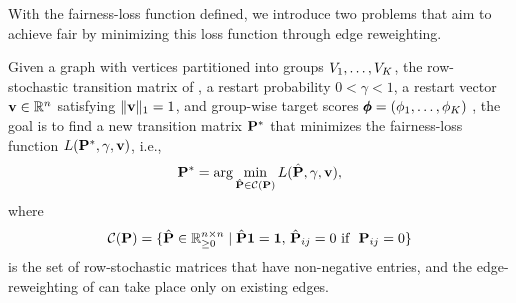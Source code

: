 \documentclass[sigconf, anonymous, review]{acmart}
\begin{document}


With the fairness-loss function defined, we introduce two problems that aim to achieve fair \pagerank by minimizing this loss function through edge re\-weighting.

\begin{problem}[$\groupDist$-\pagerank]
\label{problem:fair_problem}
Given a graph \graph with vertices partitioned into groups $V_1, \ldots, V_K$, the row-stochastic transition matrix \transmatrix of \graph, a restart probability $0 < \gamma < 1$, a restart vector $\mathbf{{v}} \in \mathbb{R}^{n}$ satisfying $\|\mathbf{{v}}\|_1 = 1$, and group-wise target \pagerank scores $\pmb{\phi} = (\phi_1, \ldots, \phi_K)$ , the goal is to find a new transition matrix $\mathbf{{P}}^{*}$ that minimizes the fairness-loss function $L(\mathbf{{P}}^{*}, \gamma, \mathbf{{v}})$, i.e.,
\begin{equation}
\mathbf{{P}}^{*} = \arg \min_{\hat{\mathbf{{P}}} \in \mathcal{C}(\mathbf{{P}})} L(\hat{\mathbf{{P}}}, \gamma, \mathbf{{v}}),
\label{eq:fair_problem}
\end{equation}
where 
\begin{equation*}
\mathcal{C}(\mathbf{{P}}) = \{ \hat{\mathbf{{P}}} \in \mathbb{R}_{\geq 0}^{n \times n} \mid \hat{\mathbf{{P}}} \mathbf{1} = \mathbf{1}, \, \hat{\mathbf{{P}}}_{ij} = 0 \text{ if }~ \mathbf{{P}}_{ij} = 0 \}
\end{equation*}
is the set of row-stochastic matrices that have non-negative entries, and the edge-reweighting of \graph can take place only on existing edges.
\end{problem}
\end{document}
